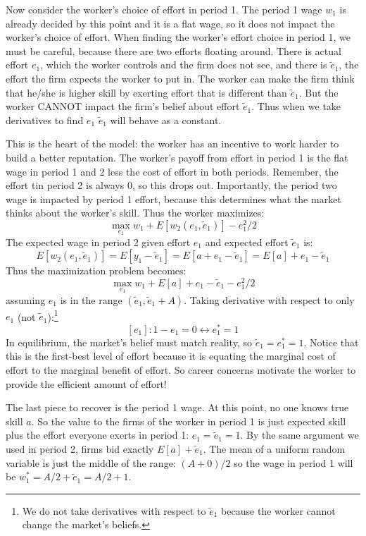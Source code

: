 \documentclass{article}
\begin{document}
Now consider the worker's choice of effort in period 1. The period 1 wage $w_1$ is already decided by this point and it is a flat wage, so it does not impact the worker's choice of effort.  When finding the worker's effort choice in period 1, we must be careful, because there are two efforts floating around. There is actual effort $e_1$, which the worker controls and the firm does not see, and there is $\tilde e_1$, the effort the firm expects the worker to put in. The worker can make the firm think that he/she is higher skill by exerting effort that is different than $\tilde e_1$. But the worker CANNOT impact the firm's belief about effort $\tilde e_1$. Thus when we take derivatives to find $e_1$ $\tilde e_1$ will behave as a constant.

This is the heart of the model: the worker has an incentive to work harder to build a better reputation. The worker's payoff from effort in period 1 is the flat wage in period 1 and 2 less the cost of effort in both periods. Remember, the effort tin period 2 is always 0, so this drops out. Importantly, the period two wage is impacted by period 1 effort, because this determines what the market thinks about the worker's skill. Thus the worker maximizes:
\[\max_{e_1} w_1 +E[w_2(e_1, \tilde e_1)]-e_1^2/2 \]
The expected wage in period 2 given effort $e_1$ and expected effort $\tilde e_1$ is: 
\[E[w_2(e_1, \tilde e_1)] = E[y_1-\tilde e_1] = E[a+e_1-\tilde e_1] =E[a] + e_1-\tilde e_1 \]
Thus the maximization problem becomes:
\[\max_{e_1} w_1 +E[a] + e_1-\tilde e_1-e_1^2/2 \]
assuming $e_1$ is in the range $(\tilde e_1, \tilde e_1+A)$. Taking derivative with respect to only $e_1$ (not $\tilde e_1$):\footnote{We do not take derivatives with respect to $\tilde e_1$ because the worker cannot change the market's beliefs.}
\[[e_1]: 1-e_1 =0 \leftrightarrow e_1^*=1\]
In equilibrium, the market's belief must match reality, so $\tilde e_1 = e_1^*=1$. Notice that this is the first-best level of effort because it is equating the marginal cost of effort to the marginal benefit of effort. So career concerns motivate the worker to provide the efficient amount of effort!

The last piece to recover is the period 1 wage. At this point, no one knows true skill $a$. So the value to the firms of the worker in period 1 is just expected skill plus the effort everyone exerts in period 1: $e_1=\tilde e_1=1$. By the same argument we used in period 2, firms bid exactly $E[a]+\tilde e_1$. The mean of a uniform random variable is just the middle of the range: $(A+0)/2$ so the wage in period 1 will be $w_1^*=A/2+\tilde e_1=A/2+1$.
 
\end{document}
